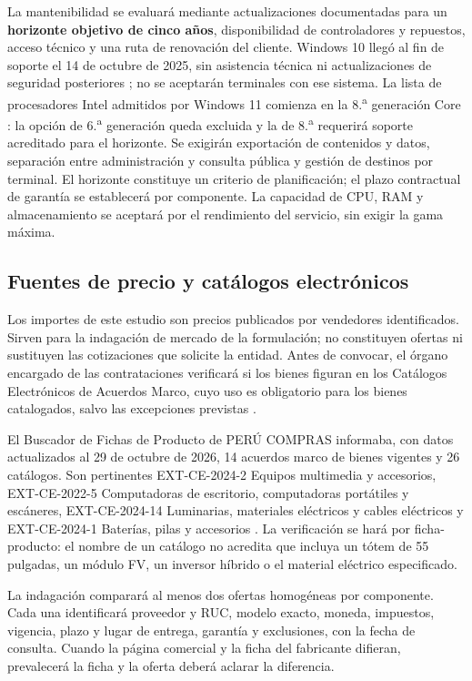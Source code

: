 La mantenibilidad se evaluará mediante actualizaciones documentadas para un \textbf{horizonte objetivo de cinco años}, disponibilidad de controladores y repuestos, acceso técnico y una ruta de renovación del cliente. Windows 10 llegó al fin de soporte el 14 de octubre de 2025, sin asistencia técnica ni actualizaciones de seguridad posteriores \cite{win10fin}; no se aceptarán terminales con ese sistema. La lista de procesadores Intel admitidos por Windows 11 comienza en la 8.\textsuperscript{a} generación Core \cite{win11cpu}: la opción de 6.\textsuperscript{a} generación queda excluida y la de 8.\textsuperscript{a} requerirá soporte acreditado para el horizonte. Se exigirán exportación de contenidos y datos, separación entre administración y consulta pública y gestión de destinos por terminal. El horizonte constituye un criterio de planificación; el plazo contractual de garantía se establecerá por componente. La capacidad de CPU, RAM y almacenamiento se aceptará por el rendimiento del servicio, sin exigir la gama máxima.

\subsection{Fuentes de precio y catálogos electrónicos}
Los importes de este estudio son precios publicados por vendedores identificados. Sirven para la indagación de mercado de la formulación; no constituyen ofertas ni sustituyen las cotizaciones que solicite la entidad. Antes de convocar, el órgano encargado de las contrataciones verificará si los bienes figuran en los Catálogos Electrónicos de Acuerdos Marco, cuyo uso es obligatorio para los bienes catalogados, salvo las excepciones previstas \cite{contrataciones}.

El Buscador de Fichas de Producto de PERÚ COMPRAS informaba, con datos actualizados al 29 de octubre de 2026, 14 acuerdos marco de bienes vigentes y 26 catálogos. Son pertinentes EXT-CE-2024-2 Equipos multimedia y accesorios, EXT-CE-2022-5 Computadoras de escritorio, computadoras portátiles y escáneres, EXT-CE-2024-14 Luminarias, materiales eléctricos y cables eléctricos y EXT-CE-2024-1 Baterías, pilas y accesorios \cite{perucompras}. La verificación se hará por ficha-producto: el nombre de un catálogo no acredita que incluya un tótem de 55 pulgadas, un módulo FV, un inversor híbrido o el material eléctrico especificado.

La indagación comparará al menos dos ofertas homogéneas por componente. Cada una identificará proveedor y RUC, modelo exacto, moneda, impuestos, vigencia, plazo y lugar de entrega, garantía y exclusiones, con la fecha de consulta. Cuando la página comercial y la ficha del fabricante difieran, prevalecerá la ficha y la oferta deberá aclarar la diferencia.

